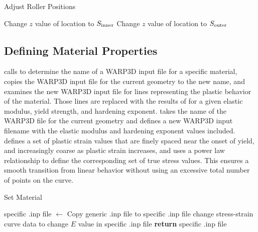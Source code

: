 \begin{algorithm}[tbp]
  \caption{Adjust Roller Positions}
  \label{alg:adjust_roller_positions}
  \begin{algorithmic}
    \State {}
      \State Change $z$ value of location to $S_\textnormal{inner}$
    \EndIf
      \State Change $z$ value of location to $S_\textnormal{outer}$
    \EndIf
    \EndProcedure
  \end{algorithmic}
\end{algorithm}

\subsection{Defining Material Properties}

 calls  to determine the name of a WARP3D input file for a specific material, copies the WARP3D input file for the current geometry to the new name, and examines the new WARP3D input file for lines representing the plastic behavior of the material. Those lines are replaced with the results of  for a given elastic modulus, yield strength, and hardening exponent.
 takes the name of the WARP3D file for the current geometry and defines a new WARP3D input filename with the elastic modulus and hardening exponent values included.
 defines a set of plastic strain values that are finely spaced near the onset of yield, and increasingly coarse as plastic strain increases, and uses a power law relationship to define the corresponding set of true stress values. This ensures a smooth transition from linear behavior without using an excessive total number of points on the curve.

\begin{algorithm}[tbp]
  \caption{Set Material}
  \label{alg:set_material}
  \begin{algorithmic}
    \State {}
    \State specific .inp file $\gets$ 
    \State {}
    \State Copy generic .inp file to specific .inp file
      \State change stress-strain curve data to 
    \EndIf
    \State change $E$ value in specific .inp file
    \State \textbf{return} specific .inp file 

    \EndProcedure
  \end{algorithmic}
\end{algorithm}

